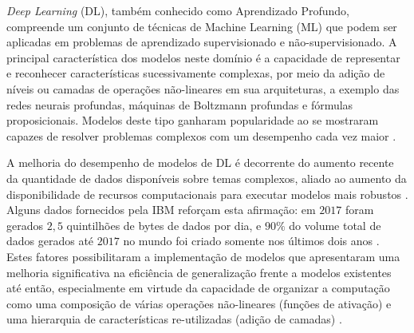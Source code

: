 
\emph{Deep Learning} (DL), também conhecido como Aprendizado Profundo, compreende um conjunto de técnicas de Machine Learning (ML) que podem ser aplicadas em problemas de aprendizado supervisionado e não-supervisionado. A principal característica dos modelos neste domínio é a capacidade de representar e reconhecer características sucessivamente complexas, por meio da adição de níveis ou camadas de operações não-lineares em sua arquiteturas, a exemplo das redes neurais profundas, máquinas de Boltzmann profundas e fórmulas proposicionais. Modelos deste tipo ganharam popularidade ao se mostraram capazes de resolver problemas complexos com um desempenho cada vez maior \cite{bengio2009learning}.

A melhoria do desempenho de modelos de DL é decorrente do aumento recente da quantidade de dados disponíveis sobre temas complexos, aliado ao aumento da disponibilidade de recursos computacionais para executar modelos mais robustos \cite{goodfellow2016deep,deng2014deep}. Alguns dados fornecidos pela IBM reforçam esta afirmação: em $2017$ foram gerados $2,5$ quintilhões de bytes de dados por dia, e $90\%$ do volume total de dados gerados até $2017$ no mundo foi criado somente nos últimos dois anos \cite{ibm2017bigdata}. Estes fatores possibilitaram a implementação de modelos que apresentaram uma melhoria significativa na eficiência de generalização frente a modelos existentes até então, especialmente em virtude da capacidade de organizar a computação como uma composição de várias operações não-lineares (funções de ativação) e uma hierarquia de características re-utilizadas (adição de camadas) \cite{goodfellow2016deep}.
%
%

